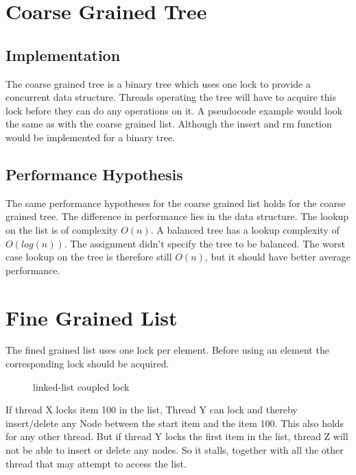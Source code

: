 \documentclass[10pt,a4paper]{article}
\begin{document}
\section{Coarse Grained Tree} \subsection{Implementation} The coarse grained
tree is a binary tree which uses one lock to provide a concurrent data
structure. Threads operating the tree will have to acquire this lock before
they can do any operations on it. A pseudocode example would look the same as
with the coarse grained list. Although the insert and rm function would be
implemented for a binary tree.

\subsection{Performance Hypothesis} The same performance hypotheses for the
coarse grained list holds for the coarse grained tree. The difference in
performance lies in the data structure. The lookup on the list is of complexity
$O(n)$. A balanced tree has a lookup complexity of $O(log(n))$. The assignment
didn't specify the tree to be balanced. The worst case lookup on the tree is
therefore still $O(n)$, but it should have better average performance.

\section{Fine Grained List} The fined grained list uses one lock per element.
Before using an element the corresponding lock should be acquired.

\begin{figure}[h] \centerline{ } \caption{linked-list coupled lock} \end{figure}

If thread X locks item 100 in the list, Thread Y can lock and thereby
insert/delete any Node between the start item and the item 100. This also holds
for any other thread. But if thread Y locks the first item in the list, thread
Z will not be able to insert or delete any nodes. So it stalls, together with
all the other thread that may attempt to access the list.
\end{document}
